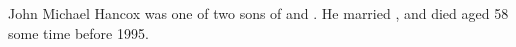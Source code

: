 
John Michael Hancox was one of two sons of  and . He married , and died aged 58 some time before 1995.
